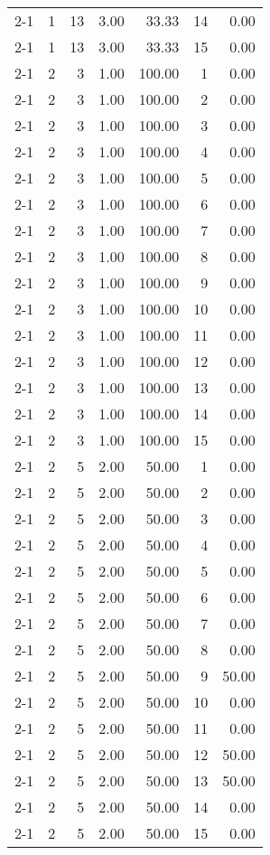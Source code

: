 \begin{tabular}{lrrrrrr}
2-1  & 1 & 13 & 3.00 & 33.33 & 14 & 0.00 \\
2-1  & 1 & 13 & 3.00 & 33.33 & 15 & 0.00 \\
2-1  & 2 & 3 & 1.00 & 100.00 & 1 & 0.00 \\
2-1  & 2 & 3 & 1.00 & 100.00 & 2 & 0.00 \\
2-1  & 2 & 3 & 1.00 & 100.00 & 3 & 0.00 \\
2-1  & 2 & 3 & 1.00 & 100.00 & 4 & 0.00 \\
2-1  & 2 & 3 & 1.00 & 100.00 & 5 & 0.00 \\
2-1  & 2 & 3 & 1.00 & 100.00 & 6 & 0.00 \\
2-1  & 2 & 3 & 1.00 & 100.00 & 7 & 0.00 \\
2-1  & 2 & 3 & 1.00 & 100.00 & 8 & 0.00 \\
2-1  & 2 & 3 & 1.00 & 100.00 & 9 & 0.00 \\
2-1  & 2 & 3 & 1.00 & 100.00 & 10 & 0.00 \\
2-1  & 2 & 3 & 1.00 & 100.00 & 11 & 0.00 \\
2-1  & 2 & 3 & 1.00 & 100.00 & 12 & 0.00 \\
2-1  & 2 & 3 & 1.00 & 100.00 & 13 & 0.00 \\
2-1  & 2 & 3 & 1.00 & 100.00 & 14 & 0.00 \\
2-1  & 2 & 3 & 1.00 & 100.00 & 15 & 0.00 \\
2-1  & 2 & 5 & 2.00 & 50.00 & 1 & 0.00 \\
2-1  & 2 & 5 & 2.00 & 50.00 & 2 & 0.00 \\
2-1  & 2 & 5 & 2.00 & 50.00 & 3 & 0.00 \\
2-1  & 2 & 5 & 2.00 & 50.00 & 4 & 0.00 \\
2-1  & 2 & 5 & 2.00 & 50.00 & 5 & 0.00 \\
2-1  & 2 & 5 & 2.00 & 50.00 & 6 & 0.00 \\
2-1  & 2 & 5 & 2.00 & 50.00 & 7 & 0.00 \\
2-1  & 2 & 5 & 2.00 & 50.00 & 8 & 0.00 \\
2-1  & 2 & 5 & 2.00 & 50.00 & 9 & 50.00 \\
2-1  & 2 & 5 & 2.00 & 50.00 & 10 & 0.00 \\
2-1  & 2 & 5 & 2.00 & 50.00 & 11 & 0.00 \\
2-1  & 2 & 5 & 2.00 & 50.00 & 12 & 50.00 \\
2-1  & 2 & 5 & 2.00 & 50.00 & 13 & 50.00 \\
2-1  & 2 & 5 & 2.00 & 50.00 & 14 & 0.00 \\
2-1  & 2 & 5 & 2.00 & 50.00 & 15 & 0.00 \\

\end{tabular}
